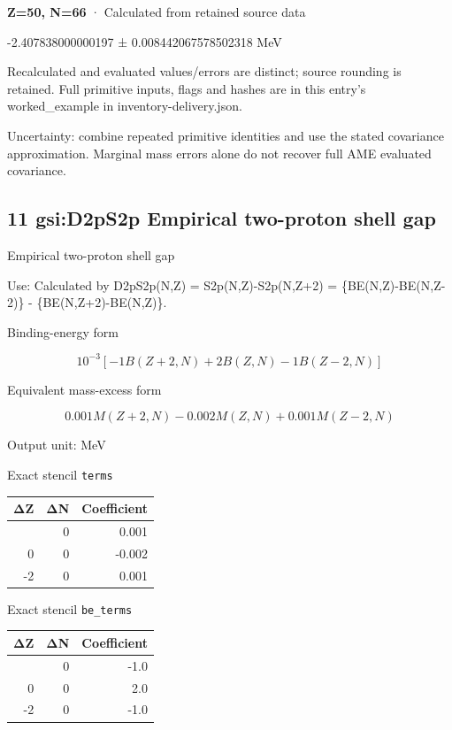 \documentclass[
  11pt,
  letterpaper,
]{article}
\begin{document}
\textbf{Z=50, N=66} · Calculated from retained source data

-2.407838000000197 ± 0.008442067578502318 MeV

Recalculated and evaluated values/errors are distinct; source rounding
is retained. Full primitive inputs, flags and hashes are in this entry's
worked\_example in inventory-delivery.json.

Uncertainty: combine repeated primitive identities and use the stated
covariance approximation. Marginal mass errors alone do not recover full
AME evaluated covariance.

\subsection{11 gsi:D2pS2p Empirical two-proton shell
gap}\label{gsid2ps2p-empirical-two-proton-shell-gap}

Empirical two-proton shell gap

Use: Calculated by D2pS2p(N,Z) = S2p(N,Z)-S2p(N,Z+2) =
\{BE(N,Z)-BE(N,Z-2)\} - \{BE(N,Z+2)-BE(N,Z)\}.

Binding-energy form

\[
10^{-3}[-1B(Z+2,N)+2B(Z,N)-1B(Z-2,N)]
\]

Equivalent mass-excess form

\[
0.001M(Z+2,N)-0.002M(Z,N)+0.001M(Z-2,N)
\]

Output unit: MeV

Exact stencil \texttt{terms}

\begin{longtable}[]{@{}rrr@{}}
\toprule\noalign{}
ΔZ & ΔN & Coefficient \\
\midrule\noalign{}
\endhead
\bottomrule\noalign{}
\endlastfoot
2 & 0 & 0.001 \\
0 & 0 & -0.002 \\
-2 & 0 & 0.001 \\
\end{longtable}

Exact stencil \texttt{be\_terms}

\begin{longtable}[]{@{}rrr@{}}
\toprule\noalign{}
ΔZ & ΔN & Coefficient \\
\midrule\noalign{}
\endhead
\bottomrule\noalign{}
\endlastfoot
2 & 0 & -1.0 \\
0 & 0 & 2.0 \\
-2 & 0 & -1.0 \\
\end{longtable}
\end{document}
